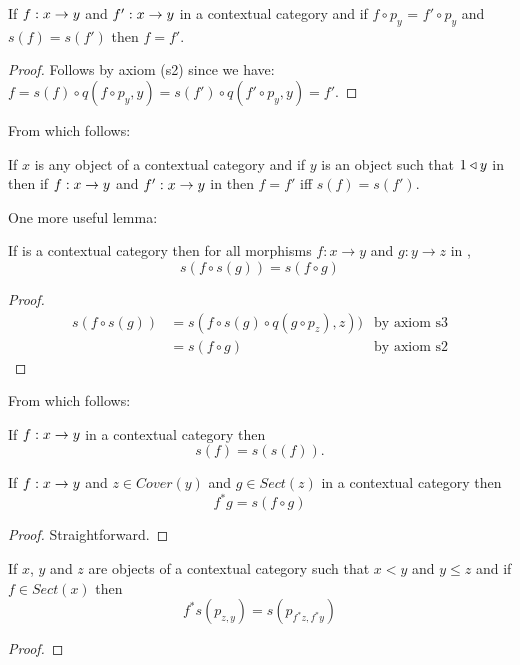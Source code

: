 \begin{lemma}
If $f: x \rightarrow y$ and $f':x \rightarrow y$ in a contextual category \catcw and if 
$f \circ p_y$ = $f' \circ p_y$ and $s(f) = s(f')$ then $f=f'$.
\end{lemma}
\begin{proof}
Follows by axiom (s2) since we have:
$f = s(f) \circ q(f \circ p_y,y)  = s(f') \circ q(f' \circ p_y,y) = f'$.
\end{proof}
From which follows:
\begin{lemma}
If $x$ is any object of a contextual category \catcw and if $y$ is an object such that $1 \triangleleft y$ in \catcw then
if $f: x \rightarrow y$ and $f':x \rightarrow y$ in  \catcw then $f=f'$ iff $s(f) = s(f')$.
\end{lemma}
One more useful lemma:
\begin{lemma}
\label{s4}  
If  is a contextual category then for all morphisms $f: x \rightarrow y$ and $g:y \rightarrow z$ in ,
$$s(f \circ s(g)) = s(f \circ g)$$
\end{lemma}
\begin{proof}
\begin{align*}
s( f \circ s(g)) 
    & = s( f \circ s(g)\circ q(g \circ p_z) , z ))  &\mbox{by axiom s3}\\
    & = s(f \circ g) &\mbox{by axiom s2} 
\end{align*}
\end{proof}
From which follows:
\begin{lemma}
If $f:x \rightarrow y$  in a contextual category \catcw  then
\begin{equation*}
s(f)=s(s(f)).
\end{equation*}
\end{lemma}
\begin{lemma}
If $f:x \rightarrow y$ and $z \in Cover(y)$ and $g \in Sect(z)$ in a contextual category \catcw then
\begin{equation*}
f^*g = s(f \circ g)
\end{equation*} 
\end{lemma}
\begin{proof}
Straightforward.
\end{proof}

\begin{lemma}
If $x$, $y$ and $z$ are objects of a contextual category \catcw such that $x <y$ and $y \leq z$ 
and if $f \in Sect(x)$ then
\begin{equation*}
f^*s(p_{z,y})=s(p_{f^*z,f^*y})
\end{equation*}
\end{lemma}
\begin{proof}
\tbd
\end{proof}


